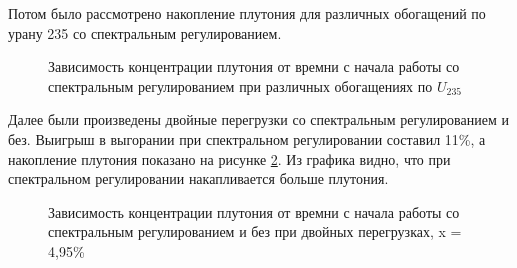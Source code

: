 \documentclass[a4paper]{article}
\begin{document}
	Потом было рассмотрено накопление плутония для различных обогащений по урану 235 со спектральным регулированием.
	\begin{figure}[h]
		\caption{Зависимость концентрации плутония от времни с начала работы со спектральным регулированием при различных обогащениях по $U_{235}$}
		\label{ris:pu2}
	\end{figure} 
	
	Далее были произведены двойные перегрузки со спектральным регулированием и без. Выигрыш в выгорании при спектральном регулировании составил 11\%, а накопление плутония показано на рисунке \ref{ris:pu2n}. Из графика видно, что при спектральном регулировании накапливается больше плутония.
	
	\begin{figure}[h]
		\caption{Зависимость концентрации плутония от времни с начала работы со спектральным регулированием и без при двойных перегрузках, x = 4,95\%}
		\label{ris:pu2n}
	\end{figure} 
	
	
\end{document}
